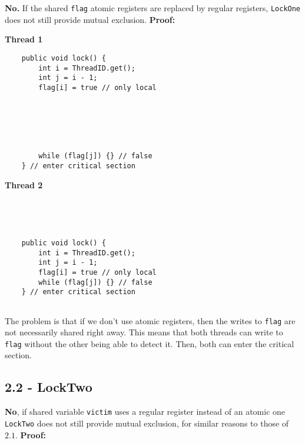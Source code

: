 \documentclass[11pt, letterpaper]{article}
\newcommand{\code}[1] { \texttt{#1} }
\begin{document}
\textbf{No.} If the shared \code{flag} atomic registers are replaced by regular registers, \code{LockOne} does not still provide mutual exclusion. \textbf{Proof:}

\begin{figure*}[h!]
    \begin{minipage}{0.5\textwidth}
        \centering
        \textbf{Thread 1}
        \begin{verbatim}
    public void lock() {
        int i = ThreadID.get();
        int j = i - 1;
        flag[i] = true // only local






        while (flag[j]) {} // false
    } // enter critical section
        \end{verbatim}
    \end{minipage}
    \hspace{.5cm}
    \begin{minipage}{0.5\textwidth}
        \centering
        \textbf{Thread 2}
        \begin{verbatim}




    public void lock() {
        int i = ThreadID.get();
        int j = i - 1;
        flag[i] = true // only local
        while (flag[j]) {} // false
    } // enter critical section


        \end{verbatim}
    \end{minipage}
\end{figure*}

The problem is that if we don't use atomic registers, then the writes to \code{flag} are not necessarily shared right away. This means that both threads can write to \code{flag} without the other being able to detect it. Then, both can enter the critical section.

\subsection*{2.2 - LockTwo}
\label{sub:2_2_locktwo}

\textbf{No}, if shared variable \code{victim} uses a regular register instead of an atomic one \code{LockTwo} does not still provide mutual exclusion, for similar reasons to those of $2.1$. \textbf{Proof:}
\end{document}
